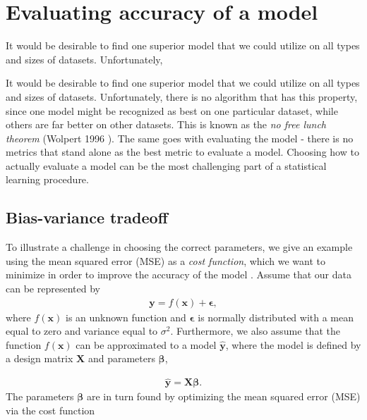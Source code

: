 \section{Evaluating accuracy of a model}

It would be desirable to find one superior model that we could utilize on all types and sizes of datasets. Unfortunately,

It would be desirable to find one superior model that we could utilize on all types and sizes of datasets. Unfortunately, there is no algorithm that has this property, since one model might be recognized as best on one particular dataset, while others are far better on other datasets. This is known as the \textit{no free lunch theorem} (Wolpert 1996 \cite{Wolpert1996}). The same goes with evaluating the model - there is no metrics that stand alone as the best metric to evaluate a model. Choosing how to actually evaluate a model can be the most challenging part of a statistical learning procedure.

\subsection{Bias-variance tradeoff}

To illustrate a challenge in choosing the correct parameters, we give an example using the mean squared error (MSE) as a \textit{cost function}, which we want to minimize in order to improve the accuracy of the model \cite{Murphy2012}. Assume that our data can be represented by
\begin{align*}
\boldsymbol{y}=f(\boldsymbol{x}) + \boldsymbol{\epsilon},
\end{align*}
where $f(\boldsymbol{x})$ is an unknown function and $\boldsymbol{\epsilon}$ is normally distributed with a mean equal to zero and variance equal to $\sigma^2$. Furthermore, we also assume that the function $f(\boldsymbol{x})$ can be approximated to a model $\boldsymbol{\hat{y}}$, where the model is defined by a design matrix $\boldsymbol{X}$ and parameters $\boldsymbol{\beta}$,

\begin{align*}
\boldsymbol{\hat{y}} = \boldsymbol{X}\boldsymbol{\beta}.
\end{align*}
The parameters $\boldsymbol{\beta}$ are in turn found by optimizing the mean squared error (MSE) via the cost function

